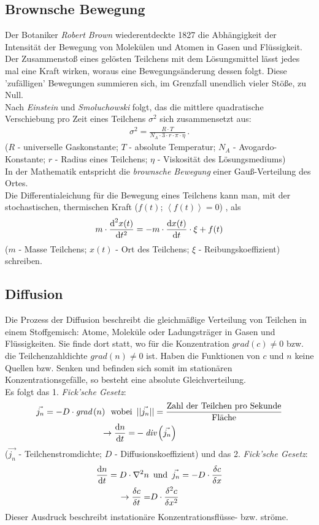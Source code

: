 \documentclass[numbers=noenddot,12pt,a4paper]{scrartcl}
\newcommand{\diff}{\textnormal{d}}
\newcommand{\tilt}[1]{\textit{#1}}
\newcommand{\grad}[1]{\textit{grad}\left(#1\right)}
\newcommand{\divergenz}[1]{\textit{div}\left(#1\right)}
\begin{document}
\subsection{Brownsche Bewegung}
Der Botaniker \tilt{Robert Brown} wiederentdeckte 1827 die Abhängigkeit der Intensität der Bewegung von Molekülen und Atomen in Gasen und Flüssigkeit. Der Zusammenstoß eines gelösten Teilchens mit dem Lösungsmittel lässt jedes mal eine Kraft wirken, woraus eine Bewegungsänderung dessen folgt. Diese 'zufälligen' Bewegungen summieren sich, im Grenzfall unendlich vieler Stöße, zu Null.\\
Nach \tilt{Einstein} und \tilt{Smoluchowski} folgt, das die mittlere quadratische Verschiebung pro Zeit eines Teilchens $\sigma^2$ sich zusammensetzt aus:
\begin{align*}
\sigma^2=\frac{R \cdot T}{N_{A}\cdot 3 \cdot r \cdot \pi \cdot \eta} \, .
\end{align*}
($R$ - universelle Gaskonstante; $T$ - absolute Temperatur; $N_{A}$ - Avogardo-Konstante; $r$ - Radius eines Teilchens; $\eta$ - Viskosität des Lösungsmediums) \\
In der Mathematik entspricht die \tilt{brownsche Bewegung} einer Gauß-Verteilung des Ortes.\\
Die Differentialeichung für die Bewegung eines Teilchens kann man, mit der stochastischen, thermischen Kraft ($f(t)$; $ \left\langle f(t) \right\rangle =0$) , als
\begin{align*}
m \cdot \frac{\diff^2 x(t)}{\diff t^2}=-m \cdot \frac{\diff x(t)}{\diff t} \cdot \xi + f(t)
\end{align*}
($m$ - Masse Teilchens; $x(t)$ - Ort des Teilchens; $\xi$ - Reibungskoeffizient) schreiben.
\subsection{Diffusion}
Die Prozess der Diffusion beschreibt die gleichmäßige Verteilung von Teilchen in einem Stoffgemisch: Atome, Moleküle oder Ladungsträger in Gasen und Flüssigkeiten. Sie finde dort statt, wo für die Konzentration $\grad{c} \neq 0$ bzw. die Teilchenzahldichte $\grad{n} \neq 0$ ist. Haben die Funktionen von $c$ und $n$ keine Quellen bzw. Senken und befinden sich somit im stationären Konzentrationsgefälle, so besteht eine absolute Gleichverteilung. \\
Es folgt das 1. \tilt{Fick'sche Gesetz}:
\begin{align*}
\vec{j_n}=-D\cdot\grad{n} \, \text{ wobei } &\, ||\vec{j_n}||=\frac{\text{Zahl der Teilchen pro Sekunde}}{\text{Fläche}} \\
\rightarrow \frac{\diff n}{\diff t}=&-\divergenz{\vec{j_n}}
\end{align*}
($\vec{j_n}$ - Teilchenstromdichte; $D$ - Diffusionskoeffizient) und das 2. \tilt{Fick'sche Gesetz}:
\begin{align*}
\frac{\diff n}{\diff t}=D\cdot \nabla^2 n \, &\text{ und } \, \vec{j_n}=-D\cdot \frac{\delta c}{\delta x} \\
\rightarrow \frac{\delta c}{\delta t}=&D\cdot \frac{\delta^2 c}{\delta x^2}
\end{align*}
Dieser Ausdruck beschreibt instationäre Konzentrationsflüsse- bzw. ströme.
\end{document}

